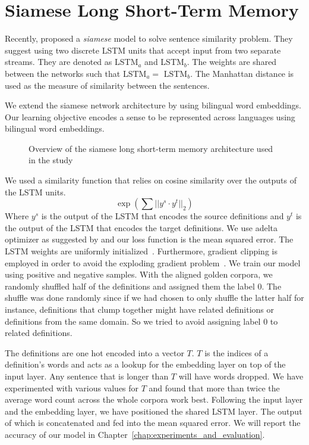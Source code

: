 \section{Siamese Long Short-Term Memory}%
\label{sec:siamese_long_short_term_memory}

Recently, \textcite{mueller_siamese_2016} proposed a \emph{siamese} model to solve sentence similarity problem.
They suggest using two discrete LSTM units that accept input from two separate streams.
They are denoted as LSTM$_a$ and LSTM$_b$.
The weights are shared between the networks such that LSTM$_a = $ LSTM$_b$.
The Manhattan distance is used as the measure of similarity between the sentences.

We extend the siamese network architecture by using bilingual word embeddings.
Our learning objective encodes a sense to be represented across languages using bilingual word embeddings.


\begin{figure}[htbp]
    \centering
    \caption{Overview of the siamese long short-term memory architecture used in the study}%
    \label{fig:lstm_model_overview}
\end{figure}

We used a similarity function that relies on cosine similarity over the outputs of the LSTM units.
\begin{equation}
    \exp(\sum{||y^{s}\cdot y^{t}}||_2)
\end{equation}
Where $y^{s}$ is the output of the LSTM that encodes the source definitions and $y^{t}$ is the output of the LSTM that encodes the target definitions.
We use adelta optimizer as suggested by \textcite{zeilerADADELTA2012} and our loss function is the mean squared error.
The LSTM weights are uniformly initialized~\cite{glorotUnderstanding2010}.
Furthermore, gradient clipping is employed in order to avoid the exploding gradient problem~\cite{pascanudifficulty2012}.
We train our model using positive and negative samples.
With the aligned golden corpora, we randomly shuffled half of the definitions and assigned them the label 0.
The shuffle was done randomly since if we had chosen to only shuffle the latter half for instance, definitions that clump together might have related definitions or definitions from the same domain.
So we tried to avoid assigning label 0 to related definitions.

The definitions are one hot encoded into a vector $T$.
$T$ is the indices of a definition's words and acts as a lookup for the embedding layer on top of the input layer.
Any sentence that is longer than $T$ will have words dropped.
We have experimented with various values for $T$ and found that more than twice the average word count across the whole corpora work best.
Following the input layer and the embedding layer, we have positioned the shared LSTM layer.
The output of which is concatenated and fed into the mean squared error.
We will report the accuracy of our model in Chapter~\ref{chap:experiments_and_evaluation}.
